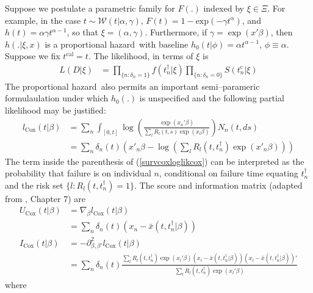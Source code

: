 \documentclass{article}
\newcommand{\tcal}{t^{\mathrm{cal}}}
\newcommand{\tfail}{t^{\dag}}
\newcommand{\tcens}{t^{\mathrm{c}}}
\newcommand{\tmin}{t^{*}}
\newcommand{\isfail}{\delta}
\newcommand{\atrisk}{R}
\newcommand{\unitcount}{N}
\newcommand{\survfullcov}{x}
\newcommand{\nentry}{n}
\newcommand{\nentries}{n_*}
\newcommand{\nfailed}{n_{\dag}}
\newcommand{\basehazard}{h_{0}}
\newcommand{\hazard}{h}
\newcommand{\surv}{S}
\newcommand{\coxloglik}{l_{\mathrm{Cox}}}
\newcommand{\coxscore}{U_{\mathrm{Cox}}}%
\newcommand{\coxinfo}{I_{\mathrm{Cox}}}
\newcommand{\survfulleffect}{\beta}
\newcommand{\survfullpar}{\xi}
\newcommand{\survbasepar}{\phi}
\newcommand{\ph}{proportional hazard}
\newcommand{\survcoxlogliksellke}{\sum_n \int_{[0,t]} 
\log\left(\frac{\exp(\survfullcov_\nentry'\beta)}{\sum_l R_l(t,s)\exp(\survfullcov_l\beta)}
\right)\unitcount_n(t,ds)}
\newcommand{\survcoxloglikcox}{\sum_n \isfail_\nentry(t) \left(\survfullcov'_\nentry\survfulleffect-\log\left(\sum_l  \atrisk_l(t,\tfail_\nentry) \exp(x'_\nentry\survfulleffect)\right)\right)
}
\begin{document}
Suppose we postulate a parametric family for $F(.)$ indexed by $\survfullpar\in\Xi$. For example, in the case $t\sim\mathcal{W}(t|\alpha,\gamma)$, $F(t)=1-\mathrm{exp}(-\gamma t^\alpha)$, and $\hazard(t)=\alpha \gamma t^{\alpha-1}$, so that  $\survfullpar=(\alpha,\gamma)$. Furthermore, if $\gamma=\exp(x'\survfulleffect)$, then $\hazard(.|\survfullpar,\survfullcov)$ is a \ph\ with baseline $\basehazard(t|\survbasepar)=\alpha t^{\alpha-1}$, $\phi\equiv\alpha$. Suppose we fix $\tcal=t$. The likelihood, in terms of $\survfullpar$ is %
\begin{align}\label{lik_surv_anal_param_1}
L(D|\survfullpar)&=\prod_{\{n:\isfail_\nentry=1\}} f(\tfail_n|\survfullpar)\prod_{\{\nentry:\isfail_\nentry=0\}} \surv(\tcens_n|\survfullpar)%
\end{align}
The \ph\ also permits an important semi--parameric formulaulation under which $\basehazard(.)$ is unspecified and the following partial likelihood\cite{Sellke1983}
may be justified: 
\begin{align}\label{survcoxlogliksellke}
\coxloglik(t|\survfulleffect)&=\survcoxlogliksellke  %
\\\label{survcoxloglikcox}
&=\survcoxloglikcox
\end{align}%
The term inside the parenthesis of (\ref{survcoxloglikcox}) can be interpreted as the probability that failure is on individual $\nentry$, conditional on failure time equating $\tfail_\nentry$ and the risk set $\{l:\atrisk_l(t,\tfail_\nentry)=1\}$. %
The score and information matrix (adapted from \cite{Lawless2002}, Chapter 7) are
\begin{align}\label{coxscore}
\coxscore(t|\survfulleffect)&=\nabla_{\survfulleffect} \coxloglik(t|\survfulleffect)\\\label{coxscore2}
&=\sum_{\nentry} \isfail_{\nentry}(t) (\survfullcov_\nentry-\bar x(t,\tfail_\nentry|\survfulleffect))\\
\label{coxinfo}
\coxinfo(t|\survfulleffect)&=-\partial_{\beta,\beta'}^2 \coxloglik(t|\survfulleffect)\\\label{coxinfo2}
&=\sum_\nentry \isfail_{\nentry}(t) \frac{\sum_l \atrisk_l(t,\tfail_\nentry)\exp(\survfullcov_l'\survfulleffect)(\survfullcov_l-\bar \survfullcov(t,\tfail_\nentry|\survfulleffect))(\survfullcov_l-\bar \survfullcov(t,\tfail_\nentry|\survfulleffect))'}{\sum_l \atrisk_l(t,\tfail_\nentry)\exp(\survfullcov_l'\survfulleffect)}
\end{align}where
\end{document}
